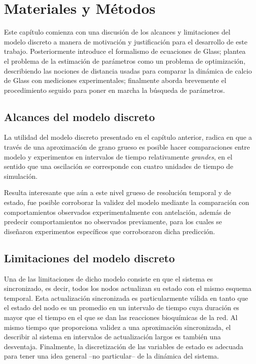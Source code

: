 \chapter{Materiales y M\'etodos}\label{ch:matmet} %
Este capítulo comienza con una discusión de los alcances y limitaciones del modelo discreto a manera de motivación y justificación para el desarrollo de este trabajo. Posteriormente introduce el formalismo de ecuaciones de Glass; plantea el problema de la estimación de parámetros como un problema de optimización, describiendo las nociones de distancia usadas para comparar la dinámica de calcio de Glass con mediciones experimentales; finalmente aborda brevemente el procedimiento seguido para poner en marcha la búsqueda de parámetros.

\section{Alcances del modelo discreto}

La utilidad del modelo discreto presentado en el capítulo anterior, radica en que a través de una aproximación de grano grueso es posible hacer comparaciones entre modelo y experimentos en intervalos de tiempo relativamente \emph{grandes}, en el sentido que una oscilación se corresponde con cuatro unidades de tiempo de simulación. 

Resulta interesante que aún a este nivel grueso de resolución temporal y de estado, fue posible corroborar la validez del modelo mediante la comparación con comportamientos observados experimentalmente con antelación, además de predecir comportamientos no observados previamente, para los cuales se diseñaron experimentos específicos que corroboraron dicha predicción.

\section{Limitaciones del modelo discreto}

Una de las limitaciones de dicho modelo consiste en que el sistema es sincronizado, es decir, todos los nodos actualizan su estado con el mismo esquema temporal. Esta actualización sincronizada es particularmente válida en tanto que el estado del nodo es un promedio en un intervalo de tiempo cuya duración es mayor que el tiempo en el que se dan las reacciones bioquímicas de la red. Al mismo tiempo que proporciona validez a una aproximación sincronizada, el describir al sistema en intervalos de actualización largos es también una desventaja. Finalmente, la discretización de las variables de estado es adecuada para tener una idea general --no particular-- de la dinámica del sistema. 


